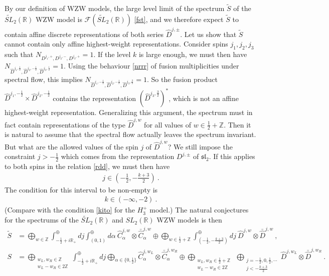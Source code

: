 \documentclass[12pt,a4paper,notitlepage]{report}
\numberwithin{equation}{section}
\theoremstyle{break}
\begin{document}
By our definition of WZW models, the large level limit of the spectrum $\tilde{S}$ of the $\widetilde{SL}_2(\mathbb{R})$ WZW model is $\mathcal{F}(\widetilde{SL}_2(\mathbb{R}))$ \eqref{fst}, and we therefore expect $\tilde{S}$ to contain affine discrete representations of both series $\hat{D}^{j,\pm}$.
Let us show that $\tilde{S}$ cannot contain only affine highest-weight representations.
Consider spins $j_1,j_2,j_3$ such that $N_{D^{j_1,+},D^{j_2,-},D^{j_3,+}}=1$.
If the level $k$ is large enough, we must then have $N_{\hat{D}^{j_1,\frac12},\hat{D}^{j_2,-\frac12},\hat{D}^{j_3,\frac12}}=1$.
Using the behaviour \eqref{nrrr} of fusion multiplicities under spectral flow, this implies $N_{\hat{D}^{j_1,-\frac12},\hat{D}^{j_2,-\frac12},\hat{D}^{j_3,\frac32}}=1$.
So the fusion product $\hat{D}^{j_1,-\frac12}\times \hat{D}^{j_2,-\frac12}$ contains the representation $(\hat{D}^{j_3,\frac32})^*$, which is not an affine highest-weight representation.
Generalizing this argument, the spectrum must in fact contain 
representations of the type $\hat{D}^{j,w}$ for all values of $w\in \frac12+{\mathbb{Z}}$.
Then it is natural to assume that the spectral flow actually leaves the spectrum invariant.
But what are the allowed values of the spin $j$ of $\hat{D}^{j,w}$? We still impose the constraint $j>-\frac12$ which comes from the representation $D^{j,\pm}$ of $\mathfrak{sl}_2$.
If this applies to both spins in the relation \eqref{rdd}, we must then have 
\begin{align}
 j\in \left(-\frac12, -\frac{k+3}{2}\right)\ .
\label{jimm}
\end{align}
The condition for this interval to be non-empty is
\begin{align}
 \boxed{k\in(-\infty,-2)}\ .
\end{align}
(Compare with the condition \eqref{kito} for the $H_3^+$ model.) The natural conjectures for the spectrums of the $\widetilde{SL}_2(\mathbb{R})$ and $SL_2(\mathbb{R})$ WZW models is then
\begin{align}
 \tilde{S} &= \bigoplus_{w\in{\mathbb{Z}}}\int^\oplus_{-\frac12+i{\mathbb{R}}_+} dj \int^\oplus_{(0,1)} d\alpha\ \hat{C}^{j,w}_\alpha \otimes \bar{\hat{C}}^{j,w}_{\alpha} 
\oplus \bigoplus_{w\in\frac12+{\mathbb{Z}}}\int^\oplus_{(-\frac12,-\frac{k+3}{2})} dj\ \hat{D}^{j,w}\otimes \bar{\hat{D}}^{j,w} \ ,
\\
 S &= \bigoplus_{\substack{w_L,w_R\in{\mathbb{Z}}\\ w_L-w_R\in 2{\mathbb{Z}}}}\int^\oplus_{-\frac12+i{\mathbb{R}}_+} dj \bigoplus_{\alpha\in\{0,\frac12\}} \hat{C}^{j,w_L}_\alpha \otimes \bar{\hat{C}}^{j,w_R}_{\alpha} \oplus  \bigoplus_{\substack{w_L,w_R\in\frac12+{\mathbb{Z}}\\ w_L-w_R\in 2{\mathbb{Z}}}}\ \bigoplus_{\substack{j= -\frac12, 0,\frac12,\cdots \\ j<-\frac{k+3}{2}}} \hat{D}^{j,w_L}\otimes \bar{\hat{D}}^{j,w_R} \ .
\end{align}
\end{document}
